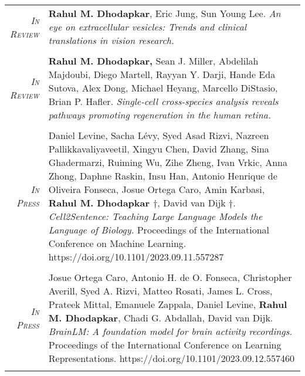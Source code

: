 \documentclass[a4paper,10pt]{article}
\begin{document}
\begin{longtable}{rp{11cm}}
\textit{\textsc{In Review}}& \textbf{Rahul M. Dhodapkar}, Eric Jung, Sun Young Lee. {\it An eye on extracellular vesicles: Trends and clinical translations in vision research.}\\
\multicolumn{2}{c}{} \\

\textit{\textsc{In Review}}& \textbf{Rahul M. Dhodapkar,} Sean J. Miller, Abdelilah Majdoubi, Diego Martell, Rayyan Y. Darji, Hande Eda Sutova, Alex Dong, Michael Heyang, Marcello DiStasio, Brian P. Hafler. {\it Single-cell cross-species analysis reveals pathways promoting regeneration in the human retina.}\\
\multicolumn{2}{c}{} \\

\textit{\textsc{In Press}}& Daniel Levine, Sacha Lévy, Syed Asad Rizvi, Nazreen Pallikkavaliyaveetil, Xingyu Chen, David Zhang, Sina Ghadermarzi, Ruiming Wu, Zihe Zheng, Ivan Vrkic, Anna Zhong, Daphne Raskin, Insu Han, Antonio Henrique de Oliveira Fonseca, Josue Ortega Caro, Amin Karbasi, \textbf{Rahul M. Dhodapkar $\dag$}, David van Dijk $\dag$. {\it Cell2Sentence: Teaching Large Language Models the Language of Biology.} Proceedings of the International Conference on Machine Learning. https://doi.org/10.1101/2023.09.11.557287\\
\multicolumn{2}{c}{} \\

\textit{\textsc{In Press}}& Josue Ortega Caro, Antonio H. de O. Fonseca, Christopher Averill, Syed A. Rizvi, Matteo Rosati, James L. Cross, Prateek Mittal, Emanuele Zappala, Daniel Levine, \textbf{Rahul M. Dhodapkar}, Chadi G. Abdallah, David van Dijk. {\it BrainLM: A foundation model for brain activity recordings.} Proceedings of the International Conference on Learning Representations. https://doi.org/10.1101/2023.09.12.557460 \\
\multicolumn{2}{c}{} \\


\end{longtable}
\end{document}
